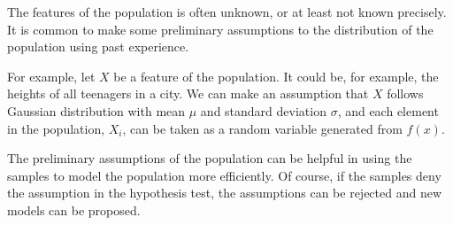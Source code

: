 The features of the population is often unknown, or at least not known precisely. It is common to make some preliminary assumptions to the distribution of the population using past experience.

For example, let $X$ be a feature of the population. It could be, for example, the heights of all teenagers in a city. We can make an assumption that $X$ follows Gaussian distribution with mean $\mu$ and standard deviation $\sigma$, and each element in the population, $X_i$, can be taken as a random variable generated from $f(x)$.

The preliminary assumptions of the population can be helpful in using the samples to model the population more efficiently. Of course, if the samples deny the assumption in the hypothesis test, the assumptions can be rejected and new models can be proposed.
